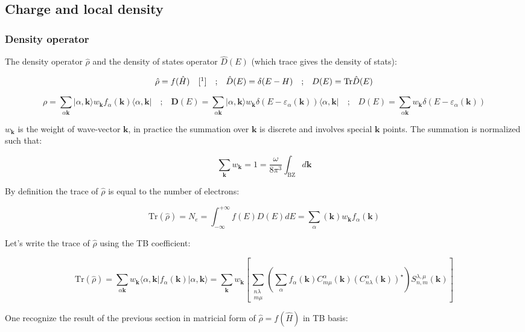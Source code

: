 \documentclass{article}
\newcommand{\bra}[1]{\langle #1|}
\newcommand{\ket}[1]{|#1\rangle}
\newcommand{\op}[1]{\hat{#1}}
\begin{document}
\subsection{Charge and local density}


\subsubsection{Density operator}

\noindent The density operator $\op{\rho}$ and the density of states operator $\op{D}(E)$ (which trace gives the density of stats):

\[\op{\rho}=f(\op{H})\quad[\footnote{$f(x)=\frac{1}{1+\exp(\frac{x-E_f}{k_BT})}$}]
\quad \mbox{;} \quad \op{D}(E)=\delta(E-H) \quad \mbox{;}
\quad D(E)=\mbox{Tr}\op{D}(E) \]

\[\rho=\sum_{\alpha \mathbf{k}} \ket{\alpha,\mathbf{k}} w_{\mathbf{k}} f_{\alpha}(\mathbf{k})
\bra{\alpha,\mathbf{k}} \quad \mbox{;} \quad
\bm{D}(E)=\sum_{\alpha \mathbf{k}} \ket{\alpha,\mathbf{k}}
w_{\mathbf{k}}\delta(E-\varepsilon_{\alpha}(\mathbf{k}))\bra{\alpha,\mathbf{k}} \quad \mbox{;} 
\quad D(E)=\sum_{\alpha \mathbf{k}} w_{\mathbf{k}} \delta(E-\varepsilon_{\alpha}(\mathbf{k}))
\]

\noindent
$w_{\mathbf{k}}$ is the weight of wave-vector $\mathbf{k}$, in practice the summation over
$\mathbf{k}$ is discrete and involves special $\mathbf{k}$ points. The summation is normalized such that:

\[ \sum_{\mathbf{k}}w_{\mathbf{k}}=1=  \frac{\omega}{8\pi^3}\int_{\mbox{BZ}} d\mathbf{k}\]

\noindent
By definition the trace of $\op{\rho}$ is equal to the number of electrons:

\[ \mbox{Tr}(\op{\rho})=N_e= \int_{-\infty}^{+\infty} f(E) D(E)dE
=
\sum_{\alpha}(\mathbf{k}) w_{\mathbf{k}} f_{\alpha}(\mathbf{k}) \]

\noindent Let's write the trace of $\op{\rho}$ using the TB coefficient:

\[ \displaystyle \mbox{Tr}(\op{\rho})=
\sum_{\alpha \mathbf{k}} w_{\mathbf{k}} \bra{\alpha,\mathbf{k}} f_{\alpha}(\mathbf{k})\ket{\alpha,\mathbf{k}}
=\sum_{\mathbf{k}} w_{\mathbf{k}} \left[\sum_{\substack{n\lambda\\ m \mu}} 
\left( \sum_{\alpha} f_{\alpha}(\mathbf{k})
C_{m\mu}^{\alpha}(\mathbf{k}) (C_{n \lambda}^{\alpha}(\mathbf{k}))^{\star}\right)
 S_{n,m}^{\lambda,\mu}(\mathbf{k}) \right]
 \]

\noindent
One recognize the result of the previous section in
matricial form of $\op{\rho}=f(\op{ H})$ in TB basis:
\end{document}
